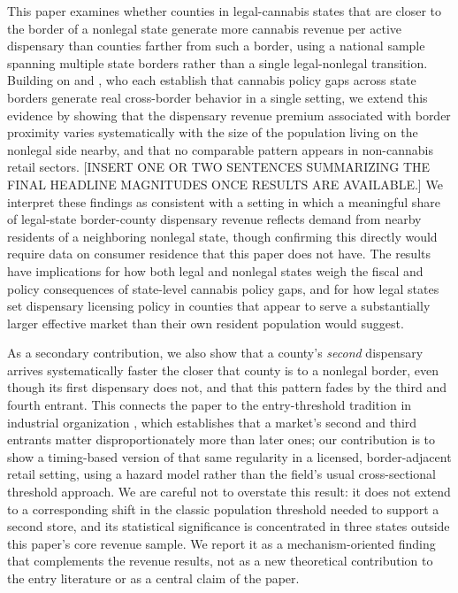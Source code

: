 \documentclass[12pt]{article}
\begin{document}
This paper examines whether counties in legal-cannabis states that are closer to the border of a nonlegal
state generate more cannabis revenue per active dispensary than counties farther from such a border, using
a national sample spanning multiple state borders rather than a single legal-nonlegal transition. Building
on \citet{HansenMillerWeber2020} and \citet{HaoCowan2020}, who each establish that cannabis policy gaps
across state borders generate real cross-border behavior in a single setting, we extend this evidence by
showing that the dispensary revenue premium associated with border proximity varies systematically with the
size of the population living on the nonlegal side nearby, and that no comparable pattern appears in
non-cannabis retail sectors. [INSERT ONE OR TWO SENTENCES SUMMARIZING THE FINAL HEADLINE MAGNITUDES ONCE
RESULTS ARE AVAILABLE.] We interpret these findings as consistent with a setting in which a meaningful share
of legal-state border-county dispensary revenue reflects demand from nearby residents of a neighboring
nonlegal state, though confirming this directly would require data on consumer residence that this paper
does not have. The results have implications for how both legal and nonlegal states weigh the fiscal and
policy consequences of state-level cannabis policy gaps, and for how legal states set dispensary licensing
policy in counties that appear to serve a substantially larger effective market than their own resident
population would suggest.

As a secondary contribution, we also show that a county's \emph{second} dispensary arrives systematically
faster the closer that county is to a nonlegal border, even though its first dispensary does not, and that
this pattern fades by the third and fourth entrant. This connects the paper to the entry-threshold tradition
in industrial organization \citep{BresnahanReiss1990,BresnahanReiss1991}, which establishes that a market's
second and third entrants matter disproportionately more than later ones; our contribution is to show a
timing-based version of that same regularity in a licensed, border-adjacent retail setting, using a hazard
model rather than the field's usual cross-sectional threshold approach. We are careful not to overstate this
result: it does not extend to a corresponding shift in the classic population threshold needed to support a
second store, and its statistical significance is concentrated in three states outside this paper's core
revenue sample. We report it as a mechanism-oriented finding that complements the revenue results, not as a
new theoretical contribution to the entry literature or as a central claim of the paper.
\end{document}
